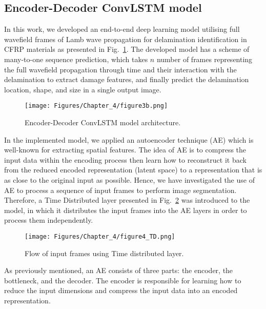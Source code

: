 \subsection{Encoder-Decoder ConvLSTM model}
\label{proposed_approach}
In this work, we developed an end-to-end deep learning model utilising full wavefield frames of Lamb wave propagation for delamination identification in CFRP materials as presented in Fig.~\ref{fig:proposed_convLSTM_model}.
The developed model has a scheme of many-to-one sequence prediction, which takes \(n\) number of frames representing the full wavefield propagation through time and their interaction with the delamination to extract damage features, and finally predict the delamination location, shape, and size in a single output image.
\begin{figure} [!h]
	\centering
	\texttt{[image: Figures/Chapter\_4/figure3b.png]}
	\caption{Encoder-Decoder ConvLSTM model architecture.}
	\label{fig:proposed_convLSTM_model}
\end{figure} 

In the implemented model, we applied an autoencoder technique (AE) which is well-known for extracting spatial features.
The idea of AE is to compress the input data within the encoding process then learn how to reconstruct it back from the reduced encoded representation (latent space) to a representation that is as close to the original input as possible. 
Hence, we have investigated the use of AE to process a sequence of input frames to perform image segmentation.
Therefore, a Time Distributed layer presented in Fig.~\ref{fig:TD} was introduced to the model, in which it distributes the input frames into the AE layers in order to process them independently.
\begin{figure}[!h]
	\centering
	\texttt{[image: Figures/Chapter\_4/figure4\_TD.png]}
	\caption{Flow of input frames using Time distributed layer.}
	\label{fig:TD}
\end{figure}

As previously mentioned, an AE consists of three parts: the encoder, the bottleneck, and the decoder.
The encoder is responsible for learning how to reduce the input dimensions and compress the input data into an encoded representation.


